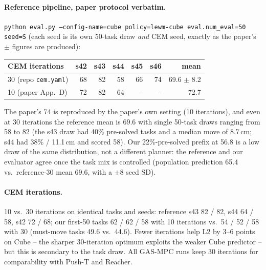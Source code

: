\documentclass[11pt]{article}
\begin{document}
\paragraph{Reference pipeline, paper protocol verbatim.} \texttt{python eval.py
--config-name=cube policy=lewm-cube eval.num\_eval=50 seed=S} (each seed is its own 50-task
draw \emph{and} CEM seed, exactly as the paper's $\pm$ figures are produced):
\begin{center}\small
\begin{tabular}{lrrrrrr}
\toprule
CEM iterations & s42 & s43 & s44 & s45 & s46 & mean \\
\midrule
30 (repo \texttt{cem.yaml}) & 68 & 82 & 58 & 66 & 74 & 69.6 $\pm$ 8.2 \\
10 (paper App.~D) & 72 & 82 & 64 & -- & -- & 72.7 \\
\bottomrule
\end{tabular}
\end{center}
The paper's 74 is reproduced by the paper's own setting (10 iterations), and even at 30
iterations the reference mean is 69.6 with single 50-task draws ranging from 58 to 82 (the
s43 draw had 40\% pre-solved tasks and a median move of 8.7\,cm; s44 had 38\% / 11.1\,cm and
scored 58). Our 22\%-pre-solved prefix at 56.8 is a low draw of the same distribution, not a
different planner: the reference and our evaluator agree once the task mix is controlled
(population prediction 65.4 vs.\ reference-30 mean 69.6, with a $\pm$8 seed SD).

\paragraph{CEM iterations.} 10 vs.\ 30 iterations on identical tasks and seeds: reference s43
82 / 82, s44 64 / 58, s42 72 / 68; our first-50 tasks 62 / 62 / 58 with 10 iterations vs.\
54 / 52 / 58 with 30 (must-move tasks 49.6 vs.\ 44.6). Fewer iterations help L2 by 3--6 points
on Cube -- the sharper 30-iteration optimum exploits the weaker Cube predictor -- but this is
secondary to the task draw. All GAS-MPC runs keep 30 iterations for comparability with Push-T
and Reacher.
\end{document}
